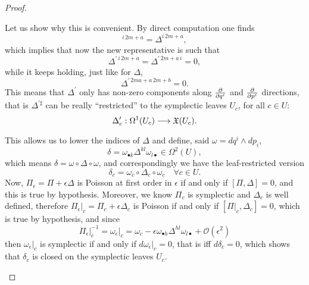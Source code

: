 \documentclass[main.tex]{subfiles}
\begin{document}
\begin{proof}
\begin{enumerate}
		Let us show why this is convenient.
		By direct computation one finds
		\begin{equation}
		 [\Pi,Z]^{i\,2m+a}=\Delta^{i\,2m+a},
		\end{equation}
		which implies that now the new representative is such that
		\begin{equation}
		 \Delta^{\prime\,i\,2m+a}=\Delta^{\prime\,2m+a\,i}=0,
		\end{equation}
		while it keeps holding, just like for $\Delta$,
		\begin{equation}
		 \Delta^{\prime\,2ma+a\,2m+b}=0.
		\end{equation}
		This means that $\Delta^\prime$ only has non-zero components along $\frac{\partial {}}{\partial {q^i}}$ and $\frac{\partial {}}{\partial {p^i}}$ directions,
		that is $\Delta^{\prime\sharp}$ can be really ``restricted'' to the symplectic leaves $U_c$, for all $c\in U$:
		\begin{equation}
		 \Delta^\prime_c:\Omega^1(U_c)\longrightarrow\mathfrak{X}(U_c).
		\end{equation}

		This allows us to lower the indices of $\Delta$ and define, said $\omega=dq^i\wedge dp_i$,
		\begin{equation}
		 \delta=\omega_{\bullet k}\Delta^{kl}\omega_{l\bullet}\in\Omega^2(U),
		\end{equation}
		which means $\delta=\omega\circ\Delta\circ\omega$, and correspondingly we have the leaf-restricted version
		\begin{equation}
		 \delta_c=\omega_c\circ\Delta_c\circ\omega_c	\quad	\forall c\in U.
		\end{equation}
		Now, $\Pi_\epsilon=\Pi+\epsilon\Delta$ is Poisson at first order in $\epsilon$ if and only if $[\Pi, \Delta]=0$,
		and this is true by hypothesis.
		Moreover, we know $\Pi_c$ is symplectic and $\Delta_c$ is well defined, therefore $\Pi_\epsilon\vert_c=\Pi_c+\epsilon\Delta_c$
		is Poisson if and only if $[\Pi\vert_c,\Delta_c]=0$, which is true by hypothesis, and since
		\begin{equation}
		 \Pi_\epsilon\vert_c^{-1}=\omega_\epsilon\vert_c=\omega_c-\epsilon\omega_{\bullet h}\Delta^{hl}\omega_{l\bullet}+\mathcal{O}(\epsilon^2)
		\end{equation}
		then $\omega_\epsilon\vert_c$ is symplectic if and only if $d\omega_\epsilon\vert_c=0$, that is iff $d\delta_c=0$,
		which shows that $\delta_c$ is closed on the symplectic leaves $U_c$.


\end{enumerate}
\end{proof}
\end{document}
